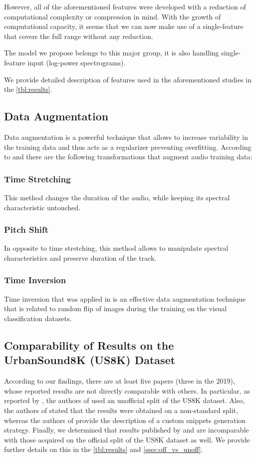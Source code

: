 \documentclass[a4paper,conference]{IEEEtran}
\begin{document}
However, all of the aforementioned features were developed with a reduction of computational complexity or compression in mind.
With the growth of computational capacity, it seems that we can now make use of a single-feature that covers the full range without any reduction.

The model we propose belongs to this major group, it is also handling single-feature input (log-power spectrograms).

We provide detailed description of features used in the aforementioned studies in the \autoref{tbl:results}.

\subsection{Data Augmentation} \label{sec:related:aug}
Data augmentation is a powerful technique that allows to increase variability in the training data and thus acts as a regularizer preventing overfitting.
According to \cite{salamon2017cnn} and \cite{tokozume2017envnetv2} there are the following transformations that augment audio training data:
\subsubsection{Time Stretching}
This method changes the duration of the audio, while keeping its spectral characteristic untouched.
\subsubsection{Pitch Shift}
In opposite to time stretching, this method allows to manipulate spectral characteristics and preserve duration of the track.
\subsubsection{Time Inversion}
Time inversion that was applied in \cite{tokozume2017envnetv2} is an effective data augmentation technique that is related to random flip of images during the training on the visual classification datasets.


\subsection{Comparability of Results on the UrbanSound8K (US8K) Dataset}
According to our findings, there are at least five papers (three in the 2019), whose reported results are not directly comparable with others.
In particular, as reported by \cite{zhang2018mixup}, the authors of \cite{agrawal2017teo} used an unofficial split of the US8K dataset.
Also, the authors of \cite{boddapati2017classifying} stated that the results were obtained on a non-standard split, whereas the authors of \cite{abdoli2019cnn1d} provide the description of a custom snippets generation strategy.
Finally, we determined that results published by \cite{su2019tscnnds} and \cite{wang2019tfnet} are incomparable with those acquired on the official split \cite{salamon2014us8k} of the US8K dataset as well.
We provide further details on this in the \autoref{tbl:results} and \autoref{ssec:off_vs_unoff}.
\end{document}
